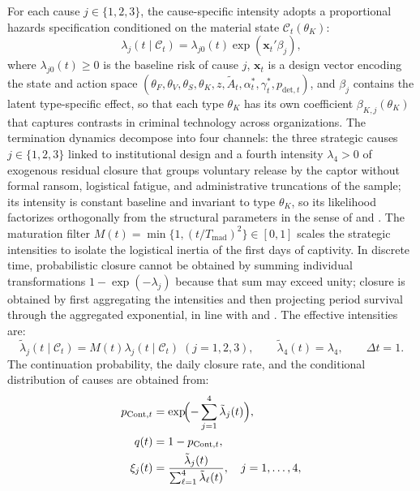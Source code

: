 \documentclass[review,authoryear,12pt]{elsarticle}
\theoremstyle{plain}
\theoremstyle{definition}
\newcommand{\1}{\mathbf{1}}
\begin{document}
For each cause $j\in\{1,2,3\}$, the cause-specific intensity adopts a proportional hazards specification conditioned on the material state $\mathcal{C}_t(\theta_K)$:
\begin{equation}
\lambda_j(t\mid\mathcal{C}_t)=\lambda_{j0}(t)\exp(\mathbf{x}_t'\beta_j),
\label{eq:lambda-j}
\end{equation}
where $\lambda_{j0}(t)\ge 0$ is the baseline risk of cause $j$, $\mathbf{x}_t$ is a design vector encoding the state and action space $(\theta_F,\theta_V,\theta_S,\theta_K,z,\tilde{A}_t,\alpha_t^\ast,\gamma_t^\ast,p_{\mathrm{det},t})$, and $\beta_j$ contains the latent type-specific effect, so that each type $\theta_K$ has its own coefficient $\beta_{K,j}(\theta_K)$ that captures contrasts in criminal technology across organizations. The termination dynamics decompose into four channels: the three strategic causes $j\in\{1,2,3\}$ linked to institutional design and a fourth intensity $\lambda_4>0$ of exogenous residual closure that groups voluntary release by the captor without formal ransom, logistical fatigue, and administrative truncations of the sample; its intensity is constant baseline and invariant to type $\theta_K$, so its likelihood factorizes orthogonally from the structural parameters in the sense of \citet{Lancaster1990} and \citet{AbbringVanDenBerg2003}. The maturation filter $M(t)=\min\{1,(t/T_{\mathrm{mad}})^2\}\in[0,1]$ scales the strategic intensities to isolate the logistical inertia of the first days of captivity. In discrete time, probabilistic closure cannot be obtained by summing individual transformations $1-\exp(-\lambda_j)$ because that sum may exceed unity; closure is obtained by first aggregating the intensities and then projecting period survival through the aggregated exponential, in line with \citet{Sueyoshi1992} and \citet{Wooldridge2010}. The effective intensities are:
\begin{equation}
\tilde{\lambda}_j(t\mid\mathcal{C}_t)=M(t)\lambda_j(t\mid\mathcal{C}_t)\;(j=1,2,3),\qquad\tilde{\lambda}_4(t)=\lambda_4,\qquad\Delta t=1.
\label{eq:hj}
\end{equation}
The continuation probability, the daily closure rate, and the conditional distribution of causes are obtained from:
\begin{align}
p_{\mathrm{Cont},t} &= \exp\!\Bigl(-\sum_{j=1}^{4}\tilde{\lambda}_j(t)\Bigr),\label{eq:pCont}\\
q(t) &= 1-p_{\mathrm{Cont},t},\label{eq:q}\\
\xi_j(t) &= \frac{\tilde{\lambda}_j(t)}{\sum_{\ell=1}^{4}\tilde{\lambda}_\ell(t)},\quad j=1,\ldots,4,\label{eq:xi}
\end{align}
\end{document}
